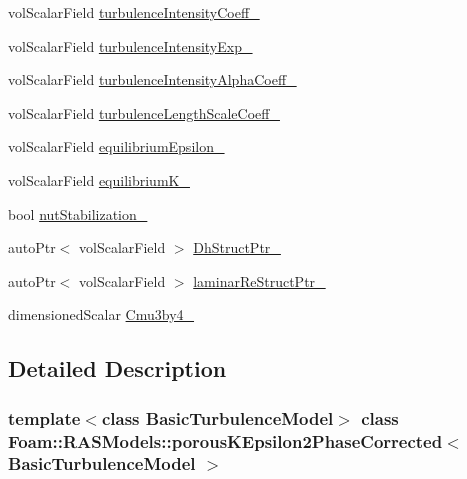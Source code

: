 \begin{DoxyCompactItemize}
\item 
vol\+Scalar\+Field \hyperlink{classFoam_1_1RASModels_1_1porousKEpsilon2PhaseCorrected_a9909ff13f66ffb4fc152e52f6568d41f}{turbulence\+Intensity\+Coeff\+\_\+}
\item 
vol\+Scalar\+Field \hyperlink{classFoam_1_1RASModels_1_1porousKEpsilon2PhaseCorrected_af7773ce49f745897e279f657ac63804d}{turbulence\+Intensity\+Exp\+\_\+}
\item 
vol\+Scalar\+Field \hyperlink{classFoam_1_1RASModels_1_1porousKEpsilon2PhaseCorrected_a094eba93cc9c9c26b62cd01de72b0189}{turbulence\+Intensity\+Alpha\+Coeff\+\_\+}
\item 
vol\+Scalar\+Field \hyperlink{classFoam_1_1RASModels_1_1porousKEpsilon2PhaseCorrected_a49e0975310b1bba34b8505f1d8a5ae09}{turbulence\+Length\+Scale\+Coeff\+\_\+}
\item 
vol\+Scalar\+Field \hyperlink{classFoam_1_1RASModels_1_1porousKEpsilon2PhaseCorrected_a3607312c86951e517e7608a5913ac67a}{equilibrium\+Epsilon\+\_\+}
\item 
vol\+Scalar\+Field \hyperlink{classFoam_1_1RASModels_1_1porousKEpsilon2PhaseCorrected_ae9fc13505ce5e750d335f39a27f71cc6}{equilibrium\+K\+\_\+}
\item 
bool \hyperlink{classFoam_1_1RASModels_1_1porousKEpsilon2PhaseCorrected_a43caf8f31a49744c7b3199c855ed9a4b}{nut\+Stabilization\+\_\+}
\item 
auto\+Ptr$<$ vol\+Scalar\+Field $>$ \hyperlink{classFoam_1_1RASModels_1_1porousKEpsilon2PhaseCorrected_a043bc965fc5a437fbcbdf7dcc16cbdae}{Dh\+Struct\+Ptr\+\_\+}
\item 
auto\+Ptr$<$ vol\+Scalar\+Field $>$ \hyperlink{classFoam_1_1RASModels_1_1porousKEpsilon2PhaseCorrected_a41c7c02bdee084f8ca2c25a56b70000d}{laminar\+Re\+Struct\+Ptr\+\_\+}
\item 
dimensioned\+Scalar \hyperlink{classFoam_1_1RASModels_1_1porousKEpsilon2PhaseCorrected_ac54aba00eda376e47e9fbf9743ebe071}{Cmu3by4\+\_\+}
\end{DoxyCompactItemize}


\subsection{Detailed Description}
\subsubsection*{template$<$class Basic\+Turbulence\+Model$>$\newline
class Foam\+::\+R\+A\+S\+Models\+::porous\+K\+Epsilon2\+Phase\+Corrected$<$ Basic\+Turbulence\+Model $>$}

